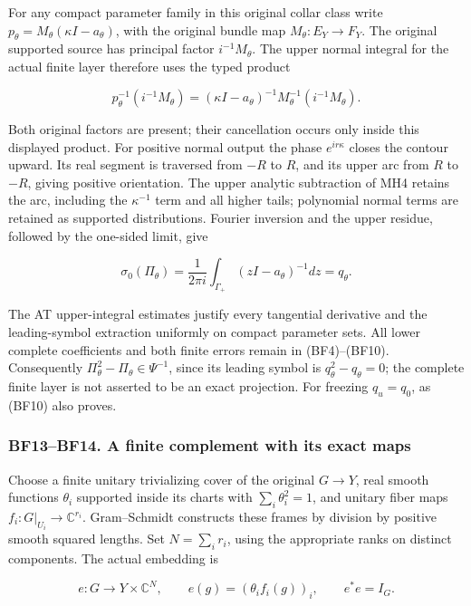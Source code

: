 \documentclass[
  11pt,
]{article}
\begin{document}
For any compact parameter family in this original collar class write
\(p_\theta=M_\theta(\kappa I-a_\theta)\), with the original bundle map
\(M_\theta:E_Y\to F_Y\). The original supported source has principal
factor \(i^{-1}M_\theta\). The upper normal integral for the actual
finite layer therefore uses the typed product

\[
 p_\theta^{-1}(i^{-1}M_\theta)
 =(\kappa I-a_\theta)^{-1}M_\theta^{-1}(i^{-1}M_\theta).
 \tag{BF11}
\]

Both original factors are present; their cancellation occurs only inside
this displayed product. For positive normal output the phase
\(e^{ir\kappa}\) closes the contour upward. Its real segment is
traversed from \(-R\) to \(R\), and its upper arc from \(R\) to \(-R\),
giving positive orientation. The upper analytic subtraction of MH4
retains the arc, including the \(\kappa^{-1}\) term and all higher
tails; polynomial normal terms are retained as supported distributions.
Fourier inversion and the upper residue, followed by the one-sided
limit, give

\[
 \sigma_0(\Pi_\theta)
 =\frac1{2\pi i}\int_{\Gamma_+}(zI-a_\theta)^{-1}dz
 =q_\theta.
 \tag{BF12}
\]

The AT upper-integral estimates justify every tangential derivative and
the leading-symbol extraction uniformly on compact parameter sets. All
lower complete coefficients and both finite errors remain in
(BF4)--(BF10). Consequently \(\Pi_\theta^2-\Pi_\theta\in\Psi^{-1}\),
since its leading symbol is \(q_\theta^2-q_\theta=0\); the complete
finite layer is not asserted to be an exact projection. For freezing
\(q_u=q_0\), as (BF10) also proves.

\subsubsection{BF13--BF14. A finite complement with its exact
maps}\label{bf13bf14.-a-finite-complement-with-its-exact-maps}

Choose a finite unitary trivializing cover of the original \(G\to Y\),
real smooth functions \(\theta_i\) supported inside its charts with
\(\sum_i\theta_i^2=1\), and unitary fiber maps
\(f_i:G|_{U_i}\to\mathbb C^{r_i}\). Gram--Schmidt constructs these
frames by division by positive smooth squared lengths. Set
\(N=\sum_i r_i\), using the appropriate ranks on distinct components.
The actual embedding is

\[
 e:G\longrightarrow Y\times\mathbb C^N,
 \qquad e(g)=(\theta_i f_i(g))_i,
 \qquad e^*e=I_G.
 \tag{BF13}
\]
\end{document}
